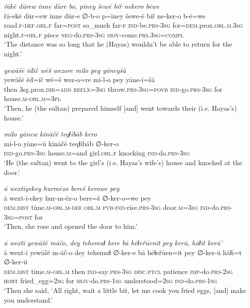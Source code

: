 \ea \label{ŽH.71}
\textit{řākē dūrew inne dūre bo, pīney šewē biř nekero bēwe} \\ 
\gll řā-ekē dūr=ew inne dūr-e ∅-b-o p=īney šewe-ē biř ne-ker-o b-ē=we \\ 
 road\textsc{\textsc{.f}}\textsc{-def}\textsc{.obl}\textsc{\textsc{.f}} far\textsc{=\textsc{post}} so\_much far\textsc{-f} \textsc{ind-}be\textsc{.prs}\textsc{-3sg} for\textsc{=dem}.prox\textsc{.obl}\textsc{.m}\textsc{.3sg} night\textsc{\textsc{.f}}\textsc{-obl}\textsc{\textsc{.f}} piece \textsc{neg-}do\textsc{.prs}\textsc{-3sg} \textsc{sbjv-}come\textsc{.prs}\textsc{.3sg}\textsc{=compl} \\ 
\glt `The distance was so long that he (Hayas) wouldn’t be able to return for the night.'
\z 
 
\ea \label{ŽH.72}
\textit{yewāšē ēđīč wēš wezore milo pey yāneyšā} \\ 
\gll yewāšē ēđ=īč wē=š wez-o=re mi-l-o pey yāne-ī=šā \\ 
 then 3sg.prox\textsc{.dir}\textsc{=add} \textsc{reflx}\textsc{=3sg} throw\textsc{.prs}\textsc{-3sg}\textsc{=\textsc{povb}} \textsc{ind-}go\textsc{.prs}\textsc{-3sg} for house\textsc{.m}\textsc{-obl}\textsc{.m}\textsc{=3pl} \\ 
\glt `Then, he (the sultan) prepared himself [and] went towards their (i.e. Hayas’s) house.'
\z 
 
\ea \label{ŽH.73}
\textit{milo yānew kināčē teqɫībāb kero} \\ 
\gll mi-l-o yāne=ū kināčē teqɫībāb ∅-ker-o \\ 
 \textsc{ind-}go\textsc{.prs}\textsc{-3sg} house\textsc{.m}=and girl\textsc{.obl}\textsc{\textsc{.f}} knocking \textsc{ind-}do\textsc{.prs}\textsc{-3sg} \\ 
\glt `He (the sultan) went to the girl’s (i.e. Hayas’s wife’s) house and knocked at the door.'
\z 
 
\ea \label{ŽH.75}
\textit{ā wextīyekey hurmēzo bereš kerowe pey} \\ 
\gll ā wext-ī-ekey hur-m-ēz-o bere=š ∅-ker-o=we pey \\ 
 \textsc{dem.dist} time\textsc{.m}\textsc{-obl}\textsc{.m}\textsc{-def}\textsc{.obl}\textsc{.m} \textsc{pvb-}\textsc{ind-}rise\textsc{.prs}\textsc{-3sg} door\textsc{.m}\textsc{=3sg} \textsc{ind-}do\textsc{.prs}\textsc{-3sg}\textsc{=\textsc{post}} for \\ 
\glt `Then, she rose and opened the door to him.'
\z 
 
\ea \label{ŽH.79}
\textit{ā wextī yewāšē māčo, dey tehemuɫ kere bā hēɫeřūenit pey kerū, hāɫīt kerū'} \\ 
\gll ā wext-ī yewāšē m-āč-o dey tehemuɫ ∅-ker-e bā hēɫeřūen=it pey ∅-ker-ū hāɫī=t ∅-ker-ū \\ 
 \textsc{dem.dist} time\textsc{.m}\textsc{-obl}\textsc{.m} then \textsc{ind-}say\textsc{.prs}\textsc{-3sg} \textsc{disc.ptcl} patience \textsc{imp-}do\textsc{.prs}-\textsc{2sg} \textsc{hort} fried\_egg\textsc{=\textsc{2sg}} for \textsc{sbjv-}do\textsc{.prs}\textsc{-1sg} understood\textsc{=\textsc{2sg}} \textsc{ind-}do\textsc{.prs}\textsc{-1sg} \\ 
\glt `Then she said, ‘All right, wait a little bit, let me cook you fried eggs, [and] make you understand.'
\z 
 
